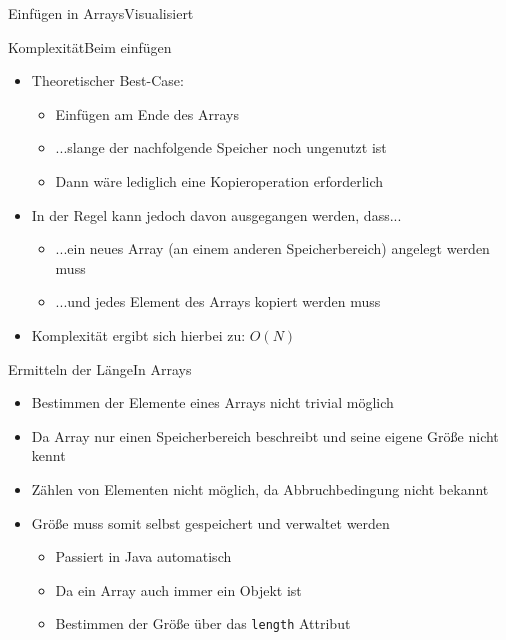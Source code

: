\begin{frame}{Einfügen in Arrays}{Visualisiert}
\end{frame}

\begin{frame}{Komplexität}{Beim einfügen}
	\begin{itemize}
		\item Theoretischer Best-Case:
		\begin{itemize}
			\item Einfügen am Ende des Arrays
			\item ...slange der nachfolgende Speicher noch ungenutzt ist
			\item Dann wäre lediglich eine Kopieroperation erforderlich
		\end{itemize}
		\item In der Regel kann jedoch davon ausgegangen werden, dass...
		\begin{itemize}
			\item ...ein neues Array (an einem anderen Speicherbereich) angelegt werden muss
			\item ...und jedes Element des Arrays kopiert werden muss
		\end{itemize}
		\item Komplexität ergibt sich hierbei zu: $O(N)$
	\end{itemize}
\end{frame}

\begin{frame}{Ermitteln der Länge}{In Arrays}
	\begin{itemize}
		\item Bestimmen der Elemente eines Arrays nicht trivial möglich
		\item Da Array nur einen Speicherbereich beschreibt und seine eigene Größe nicht kennt
		\item Zählen von Elementen nicht möglich, da Abbruchbedingung nicht bekannt
		\item Größe muss somit selbst gespeichert und verwaltet werden
		\begin{itemize}
			\item Passiert in Java automatisch
			\item Da ein Array auch immer ein Objekt ist
			\item Bestimmen der Größe über das \texttt{length} Attribut
		\end{itemize}
	\end{itemize}
\end{frame}

